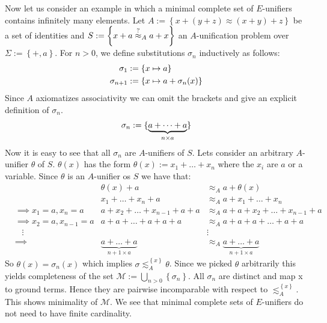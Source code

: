 Now let us consider an example in which a minimal complete set of $E$-unifiers contains infinitely many elements. Let $A:=\left\lbrace x+(y+z)\approx (x+y)+z\right\rbrace $ be a set of identities and $S:=\left\lbrace x+a\stackrel{?}{\approx}_A a+x\right\rbrace$ an $A$-unification problem over $\Sigma:=\left\lbrace +,a\right\rbrace$. For $n>0$, we define substitutions $\sigma_n$ inductively as follows:
\begin{align}
\sigma_1&:=\left\lbrace x\mapsto a\right\rbrace\notag\\
\sigma_{n+1}&:=\left\lbrace x\mapsto a+\sigma_n(x)\right\rbrace\notag
\end{align}
Since $A$ axiomatizes associativity we can omit the brackets and give an explicit definition of $\sigma_n$.
\begin{align}
\sigma_n:=\lbrace\underbrace{a+\dots+a}_{n\times a} \rbrace\notag
\end{align}
Now it is easy to see that all $\sigma_n$ are $A$-unifiers of $S$.
Lets consider an arbitrary $A$-unifier $\theta$ of $S$. $\theta(x)$ has the form $\theta(x):=x_1+\dots+x_n$ where the $x_i$ are $a$ or a variable.
Since $\theta$ is an $A$-unifier os $S$ we have that:
\begin{align*}
&&\theta(x)+a&\approx_A a+\theta(x)\\
&& x_1+\dots+x_n+a&\approx_A a+x_1+\dots+x_n\\
&\implies x_1=a,x_n=a& a+x_2+\dots+x_{n-1}+a+a&\approx_A a+a+x_2+\dots+x_{n-1}+a\\
&\implies x_2=a,x_{n-1}=a& a+a+\dots+a+a+a&\approx_A a+a+a+\dots+a+a\\
&\hspace{10pt}\vdots&&\vdots\\
&\implies&\underbrace{a+\dots+a}_{n+1\times a}&\approx_A \underbrace{a+\dots+a}_{n+1\times a}
\end{align*}
So $\theta(x)=\sigma_n(x)$ which implies $\sigma\lesssim^{\left\lbrace x\right\rbrace }_A\theta$.
Since we picked $\theta$ arbitrarily this yields completeness of the set $\mathcal{M}:=\bigcup_{n>0}\left\lbrace  \sigma_n\right\rbrace $.
All $\sigma_n$ are distinct and map x to ground terms. Hence they are pairwise incomparable with respect to $\lesssim^{\left\lbrace x\right\rbrace }_A$. This shows minimality of $\mathcal{M}$.
We see that minimal complete sets of $E$-unifiers do not need to have finite cardinality.